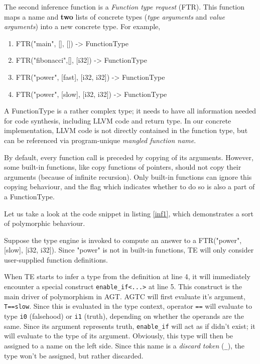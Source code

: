 \documentclass[times, utf8, diplomski]{fer}
\theoremstyle{definition}
\newcommand{\textcode}[3]{
    
}
\begin{document}
The second inference function is a \textit{Function type request} (FTR). This function maps
a name and \textbf{two} lists of concrete types (\textit{type arguments} and \textit{value arguments}) 
into a new concrete type. For example,

\begin{enumerate}
    \item FTR("main", [], []) -> FunctionType
    \item FTR("fibonacci",[], [i32]) -> FunctionType
    \item FTR("power", [fast], [i32, i32]) -> FunctionType
    \item FTR("power", [slow], [i32, i32]) -> FunctionType
\end{enumerate}

A FunctionType is a rather complex type; it needs to have all information needed for code synthesis, 
including LLVM code and return type. In our concrete implementation, LLVM code is not directly
contained in the function type, but can be referenced via program-unique \textit{mangled function name}.

By default, every function call is preceded by copying of its arguments. However, some built-in functions,
like copy functions of pointers, should not copy their arguments (because of infinite recursion).
Only built-in functions can ignore this copying behaviour, and the flag which indicates
whether to do so is also a part of a FunctionType.

Let us take a look at the code snippet in listing \ref{inf1}, 
which demonstrates a sort of polymorphic behaviour.

\textcode{\resdir/compiler/inf1.agt}{inf1}{enable\_if example}

Suppose the type engine is invoked to compute an answer to a FTR("power", [slow], [i32, i32]).
Since "power" is not in built-in functions, TE will only consider user-supplied function definitions.

When TE starts to infer a type from the definition at line 4, it will immediately encounter a special
construct \texttt{enable\_if<...>} at line 5. This construct is the main driver of polymorphism in AGT.
AGTC will first evaluate it's argument, \texttt{T==slow}. Since this is evaluated in the type context,
operator \texttt{==} will evaluate to type \texttt{i0} (falsehood) or \texttt{i1} (truth), depending on 
whether the operands are the same.
Since its argument represents truth, \texttt{enable\_if} will act as if didn't exist;
it will evaluate to the type of its argument.
Obviously, this type will then be assigned to a name on the left side. 
Since this name is a \textit{discard token}
(\texttt{\_}), the type won't be assigned, but rather discarded.
\end{document}
